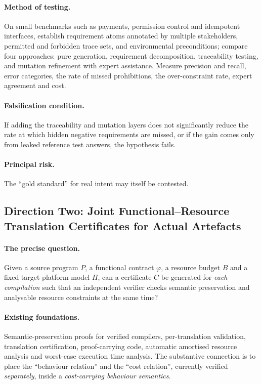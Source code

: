 \paragraph{Method of testing.}
On small benchmarks such as payments, permission control and idempotent interfaces,
establish requirement atoms annotated by multiple stakeholders, permitted and forbidden
trace sets, and environmental preconditions; compare four approaches: pure generation,
requirement decomposition, traceability testing, and mutation refinement with expert
assistance. Measure precision and recall, error categories, the rate of missed
prohibitions, the over-constraint rate, expert agreement and cost.

\paragraph{Falsification condition.}
If adding the traceability and mutation layers does not significantly reduce the rate at
which hidden negative requirements are missed, or if the gain comes only from leaked
reference test answers, the hypothesis fails.

\paragraph{Principal risk.}
The ``gold standard'' for real intent may itself be contested.

\subsection*{Direction Two: Joint Functional--Resource Translation Certificates for Actual Artefacts}

\paragraph{The precise question.}
Given a source program $P$, a functional contract $\varphi$, a resource budget $B$ and a
fixed target platform model $H$, can a certificate $C$ be generated for \emph{each
compilation} such that an independent verifier checks semantic preservation and analysable
resource constraints at the same time?

\paragraph{Existing foundations.}
Semantic-preservation proofs for verified compilers, per-translation validation,
translation certification, proof-carrying code, automatic amortised resource analysis and
worst-case execution time analysis. The substantive connection is to place the
``behaviour relation'' and the ``cost relation'', currently verified \emph{separately},
inside a \emph{cost-carrying behaviour semantics}.

